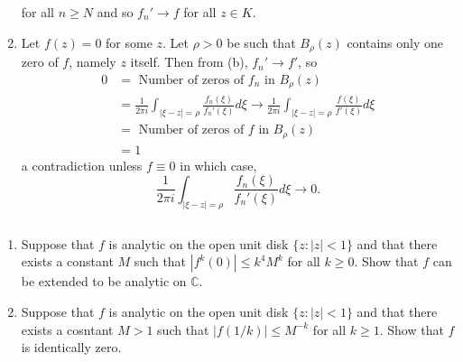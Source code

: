 \documentclass[12pt]{Qual}
\begin{document}
\begin{solution}
\begin{enumerate}[label=(\alph*)]
    for all $n\ge N$ and so $f_n'\to f$ for all $z\in K$.

    \item Let $f(z)=0$ for some $z$. Let $\rho>0$ be such that $B_\rho(z)$ contains only one zero of $f$, namely $z$ itself. Then from (b), $f_n'\to f'$, so \begin{align*}
        0&=\text{ Number of zeros of }f_n\text{ in }B_\rho(z)\\
        &=\frac{1}{2\pi i}\int_{|\xi-z|=\rho}\frac{f_n(\xi)}{f_n'(\xi)}d\xi\to\frac{1}{2\pi i}\int_{|\xi-z|=\rho}\frac{f(\xi)}{f'(\xi)}d\xi\\
        &=\text{ Number of zeros of }f\text{ in }B_\rho(z)\\
        &=1
    \end{align*} a contradiction unless $f\equiv 0$ in which case, $$\frac{1}{2\pi i}\int_{|\xi-z|=\rho}\frac{f_n(\xi)}{f_n'(\xi)}d\xi\to0.$$
\end{enumerate}
\end{solution}
\newpage





\begin{problem} $\,$
\begin{enumerate}[label=(\alph*)]
    \item Suppose that $f$ is analytic on the open unit disk $\{z:|z|<1\}$ and that there exists a constant $M$ such that $|f^k(0)|\le k^4M^k$ for all $k\ge 0.$ Show that $f$ can be extended to be analytic on $\mathbb{C}.$
    \item Suppose that $f$ is analytic on the open unit disk $\{z:|z|<1\}$ and that there exists a cosntant $M>1$ such that $|f(1/k)|\le M^{-k}$ for all $k\ge1$. Show that $f$ is identically zero.
\end{enumerate}
\end{problem}
\end{document}
